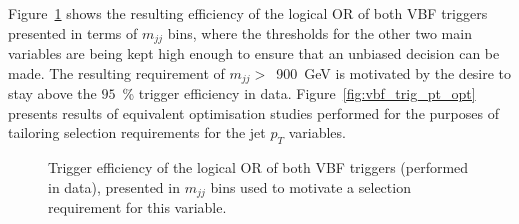 \hspace{10pt} Figure~\ref{fig:vbf_trig_mjj_opt} shows the resulting efficiency of the logical OR of both VBF triggers presented in terms of $m_{jj}$ bins, where the thresholds for the other two main variables are being kept high enough to ensure that an unbiased decision can be made. The resulting requirement of $m_{jj}>$~900~GeV is motivated by the desire to stay above the $95$~\% trigger efficiency in data. Figure~\ref{fig:vbf_trig_pt_opt} presents results of equivalent optimisation studies performed for the purposes of tailoring selection requirements for the jet $p_T$ variables.

\begin{figure}[htbp]
  \centering
\caption{Trigger efficiency of the logical OR of both VBF triggers (performed in data), presented in $m_{jj}$ bins used to motivate a selection requirement for this variable.}
\label{fig:vbf_trig_mjj_opt}
\end{figure}

